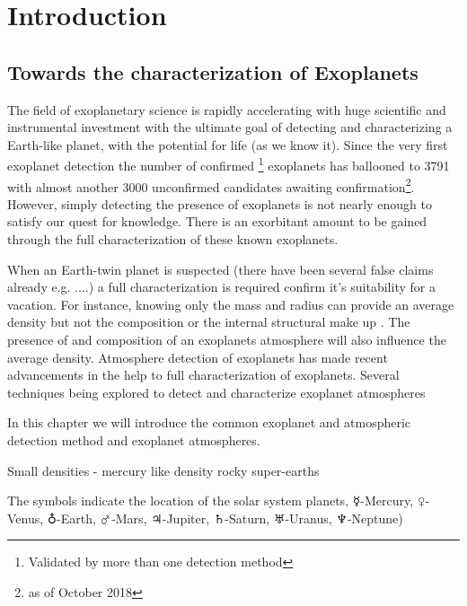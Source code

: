 \chapter{Introduction}  %
\label{cha:introduction}

\section{Towards the characterization of Exoplanets}

The field of exoplanetary science is rapidly accelerating with huge scientific and instrumental investment with the ultimate goal of detecting and characterizing a Earth-like planet, with the potential for life (as we know it). Since the very first exoplanet detection \citet{ mayor_jupitermass_1995} the number of confirmed \footnote{Validated by more than one detection method} exoplanets has ballooned to 3791 with almost another 3000 unconfirmed candidates awaiting confirmation\footnote{as of October 2018}. However, simply detecting the presence of exoplanets is not nearly enough to satisfy our quest for knowledge. There is an exorbitant amount to be gained through the full characterization of these known exoplanets.

When an Earth-twin planet is suspected (there have been several false claims already e.g. ....) a full characterization is required confirm it's suitability for a vacation. For instance, knowing only the mass and radius can provide an average density but not the composition or the internal structural make up \citet{a paper about composition degeneracy}. The presence of and composition of an exoplanets atmosphere will also influence the average density. Atmosphere detection of exoplanets has made recent advancements in the help to full characterization of exoplanets. Several techniques being explored to detect and characterize exoplanet atmospheres \citep[e.g.]{martins_reflected_2015, transmission spectroscopy,  pikorz 201  ,snellen?}

In this chapter we will introduce the common exoplanet and atmospheric detection method and exoplanet atmospheres.



Small densities - mercury like  density \citet{dittmann_temperate_2017, santerne_earthsized_2018, ment_second_2018} rocky super-earths


The symbols indicate the location of the solar system planets, $\mercury$-Mercury, $\venus$-Venus, $\earth$-Earth, $\mars$-Mars, $\jupiter$-Jupiter, $\saturn$-Saturn, $\uranus$-Uranus, $\neptune$-Neptune)


